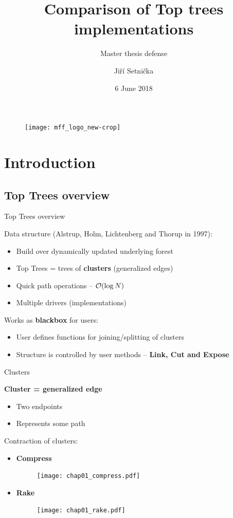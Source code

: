 \documentclass{beamer}				%
\title{Comparison of Top trees implementations}
\subtitle{Master thesis defense}
\author{Jiří Setnička}
\institute[KAM]{Department of Applied Mathematics}
\date{6 June 2018}
\begin{document}
\def\O{{\cal O}}

\begin{frame}[plain]
\vfill
\begin{figure}
	\texttt{[image: mff\_logo\_new-crop]}
\end{figure}
\titlepage
\end{frame}


\section{Introduction}
\subsection{Top Trees overview}

\begin{frame}{Top Trees overview}

Data structure (Alstrup, Holm, Lichtenberg and Thorup in 1997):
\begin{itemize}
	\item Build over dynamically updated underlying forest
	\item Top Trees = trees of {\bf clusters} (generalized edges)
	\pause\item Quick path operations -- $\O(\log N)$
	\pause\item Multiple drivers (implementations)
\end{itemize}

\bigskip
\pause Works as {\bf blackbox} for users:
\begin{itemize}
	\item User defines functions for joining/splitting of clusters
	\item Structure is controlled by user methods -- {\bf Link, Cut and Expose}
\end{itemize}
\end{frame}


\begin{frame}{Clusters}

{\bf Cluster = generalized edge}
\begin{itemize}
\item Two endpoints
\item Represents some path
\end{itemize}

\bigskip\pause
Contraction of clusters:
\begin{itemize}
\item {\bf Compress}
	\begin{figure}[h]
	\centering
	\texttt{[image: chap01\_compress.pdf]}
	\end{figure}
\item {\bf Rake}
	\begin{figure}[h]
	\centering
	\texttt{[image: chap01\_rake.pdf]}
	\end{figure}
\end{itemize}

\end{frame}
\end{document}
